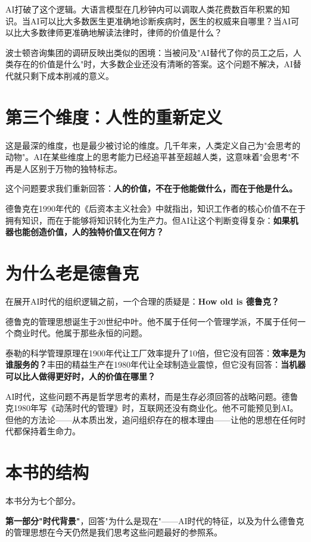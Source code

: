 AI打破了这个逻辑。大语言模型在几秒钟内可以调取人类花费数百年积累的知识。当AI可以比大多数医生更准确地诊断疾病时，医生的权威来自哪里？当AI可以比大多数律师更准确地解读法律时，律师的价值是什么？

波士顿咨询集团的调研反映出类似的困境：当被问及"AI替代了你的员工之后，人类存在的价值是什么"时，大多数企业还没有清晰的答案。这个问题不解决，AI替代就只剩下成本削减的意义。

\section{第三个维度：人性的重新定义}


这是最深的维度，也是最少被讨论的维度。几千年来，人类定义自己为"会思考的动物"。AI在某些维度上的思考能力已经追平甚至超越人类，这意味着"会思考"不再是人区别于万物的独特标志。

这个问题要求我们重新回答：\textbf{人的价值，不在于他能做什么，而在于他是什么。}

德鲁克在1990年代的《后资本主义社会》中就指出，知识工作者的核心价值不在于拥有知识，而在于能够将知识转化为生产力。但AI让这个判断变得复杂：\textbf{如果机器也能创造价值，人的独特价值又在何方？}


\section{为什么老是德鲁克}


在展开AI时代的组织逻辑之前，一个合理的质疑是：\textbf{How old is 德鲁克？}

德鲁克的管理思想诞生于20世纪中叶。他不属于任何一个管理学派，不属于任何一个商业时代。他属于那些永恒的问题。

泰勒的科学管理原理在1900年代让工厂效率提升了10倍，但它没有回答：\textbf{效率是为谁服务的？}丰田的精益生产在1980年代让全球制造业震惊，但它没有回答：\textbf{当机器可以比人做得更好时，人的价值在哪里？}

AI时代，这些问题不再是哲学思考的素材，而是生存必须回答的战略问题。德鲁克1980年写《动荡时代的管理》时，互联网还没有商业化。他不可能预见到AI。但他的方法论——从本质出发，追问组织存在的根本理由——让他的思想在任何时代都保持着生命力。


\section{本书的结构}


本书分为七个部分。

\textbf{第一部分"时代背景"}，回答"为什么是现在"——AI时代的特征，以及为什么德鲁克的管理思想在今天仍然是我们思考这些问题最好的参照系。

